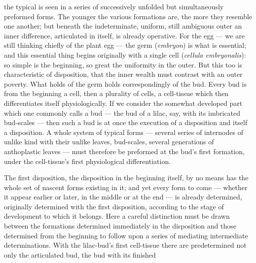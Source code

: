 \documentclass[12pt,a4paper]{book}
\begin{document}
the typical is seen in a series of successively unfolded but simultaneously
preformed forms. The younger the various formations are, the more they resemble
one another; but beneath the indeterminate, uniform, still ambiguous outer an
inner difference, articulated in itself, is already operative. For the egg ---
we are still thinking chiefly of the plant egg --- the germ (\textit{embryon})
is what is essential; and this essential thing begins originally with a single
cell (\textit{cellula embryonalis}): so simple is the beginning, so great the
uniformity in the outer. But this too is characteristic of disposition, that
the inner wealth must contrast with an outer poverty. What holds of the germ
holds correspondingly of the bud. Every bud is from the beginning a cell, then
a plurality of cells, a cell-tissue which then differentiates itself
physiologically. If we consider the somewhat developed part which one commonly
calls a bud --- the bud of a lilac, say, with its imbricated bud-scales ---
then such a bud is at once the execution of a disposition and itself a
disposition. A whole system of typical forms --- several series of internodes
of unlike kind with their unlike leaves, bud-scales, several generations of
anthoplastic leaves --- must therefore be preformed at the bud's first
formation, under the cell-tissue's first physiological differentiation.

The first disposition, the disposition in the beginning itself, by no means has
the whole set of nascent forms existing in it; and yet every form to come ---
whether it appear earlier or later, in the middle or at the end --- is already
determined, originally determined with the first disposition, according to the
stage of development to which it belongs. Here a careful distinction must be
drawn between the formations determined immediately in the disposition and
those determined from the beginning to follow upon a series of mediating
intermediate determinations. With the lilac-bud's first cell-tissue there are
predetermined not only the articulated bud, the bud with its finished
\end{document}
